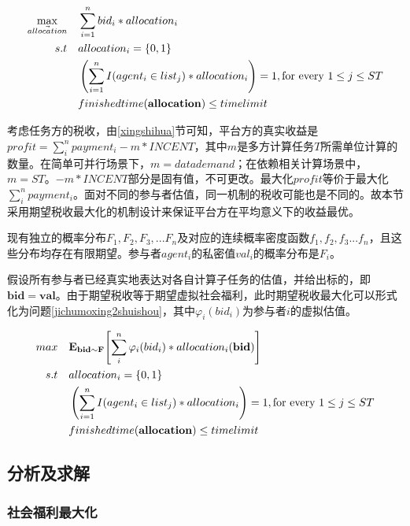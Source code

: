 \documentclass[promaster]{thesis-uestc}
\begin{document}
\begin{align}
    \label{jichumoxing2}
    \max_{\vec{allocation}} \quad&\sum_{i=1}^{n}{bid_i*allocation_i}\\
    s.t                     \quad&allocation_i = \{0,1\}\notag\\
    \quad&\left(\sum_{i=1}^{n}{I(agent_i \in list_j)*allocation_i}\right) = 1,\text{for every }1 \leq j \leq ST\notag\\
    \quad&finishedtime(\mathbf{allocation}) \leq timelimit
    \notag
\end{align}


考虑任务方的税收，由\ref{xingshihua}节可知，平台方的真实收益是$profit = \sum_{i}^{n}{payment_i}-m*INCENT$，其中$m$是多方计算任务$T$所需单位计算的数量。在简单可并行场景下，$m=datademand$；在依赖相关计算场景中，$m=ST$。$-m*INCENT$部分是固有值，不可更改。最大化$profit$等价于最大化$\sum_{i}^{n}{payment_i}$。面对不同的参与者估值，同一机制的税收可能也是不同的。故本节采用期望税收最大化的机制设计来保证平台方在平均意义下的收益最优。

现有独立的概率分布$F_1,F_2,F_3,...F_n$及对应的连续概率密度函数$f_1,f_2,f_3...f_n$，且这些分布均存在有限期望。参与者$agent_i$的私密值$val_i$的概率分布是$F_i$。

假设所有参与者已经真实地表达对各自计算子任务的估值，并给出标的，即$\mathbf{bid}=\mathbf{val}$。由于期望税收等于期望虚拟社会福利，此时期望税收最大化可以形式化为问题\ref{jichumoxing2shuishou}，其中$\varphi _i(bid_i)$为参与者$i$的虚拟估值。

\begin{align}
    \label{jichumoxing2shuishou} 
    max\quad&\mathbf{E}_{\mathbf{bid}\sim\mathbf{F}}{\left[\sum_{i}^{n}{\varphi _i(bid_i)*allocation_i(\mathbf{bid})}\right]}\\
    s.t                     \quad&allocation_i = \{0,1\}\notag\\
    \quad&\left(\sum_{i=1}^{n}{I(agent_i \in list_j)*allocation_i}\right) = 1,\text{for every }1 \leq j \leq ST\notag\\
    \quad&finishedtime(\mathbf{allocation}) \leq timelimit
    \notag
\end{align}

\FloatBarrier

\subsection{分析及求解}

\subsubsection{社会福利最大化}
\end{document}
